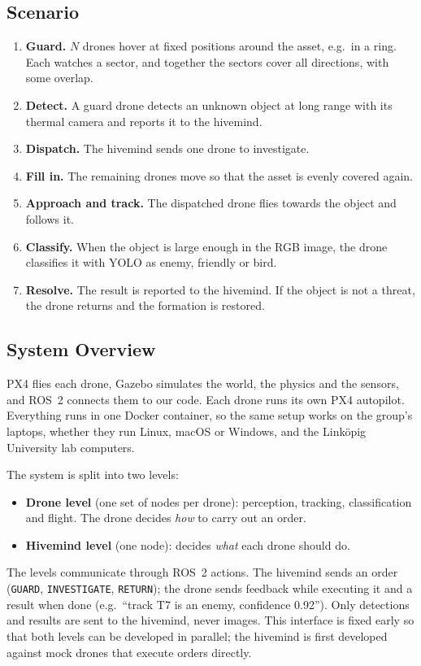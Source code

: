 \documentclass{article}
\begin{document}
\subsection{Scenario}
\begin{enumerate}
    \item \textbf{Guard.} $N$ drones hover at fixed positions around the
          asset, e.g.\ in a ring. Each watches a sector, and together the
          sectors cover all directions, with some overlap.
    \item \textbf{Detect.} A guard drone detects an unknown object at long
          range with its thermal camera and reports it to the hivemind.
    \item \textbf{Dispatch.} The hivemind sends one drone to investigate.
    \item \textbf{Fill in.} The remaining drones move so that the asset is
          evenly covered again.
    \item \textbf{Approach and track.} The dispatched drone flies towards the
          object and follows it.
    \item \textbf{Classify.} When the object is large enough in the RGB
          image, the drone classifies it with YOLO as enemy, friendly or
          bird.
    \item \textbf{Resolve.} The result is reported to the hivemind. If the
          object is not a threat, the drone returns and the formation is
          restored.
\end{enumerate}

\subsection{System Overview}
PX4 flies each drone, Gazebo simulates the world, the physics and the sensors, and ROS~2 connects them to our code. Each drone runs its own PX4 autopilot. Everything runs in one Docker container, so the same setup works on the group's laptops, whether they run Linux, macOS or Windows, and the Linköpig University lab computers.

The system is split into two levels:
\begin{itemize}
    \item \textbf{Drone level} (one set of nodes per drone): perception,
          tracking, classification and flight. The drone decides
          \emph{how} to carry out an order.
    \item \textbf{Hivemind level} (one node): decides \emph{what} each
          drone should do.
\end{itemize}
The levels communicate through ROS~2 actions. The hivemind sends an order
(\texttt{GUARD}, \texttt{INVESTIGATE}, \texttt{RETURN}); the drone sends
feedback while executing it and a result when done (e.g.\ ``track T7 is an
enemy, confidence 0.92''). Only detections and results are sent to the
hivemind, never images. This interface is fixed early so that both levels
can be developed in parallel; the hivemind is first developed against mock
drones that execute orders directly.
\end{document}
